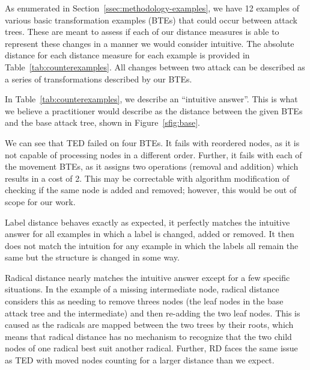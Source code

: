 As enumerated in Section~\ref{ssec:methodology-examples}, we have 12 examples of various basic transformation examples (BTEs) that could occur between attack trees. These are meant to assess if each of our distance measures is able to represent these changes in a manner we would consider intuitive. The absolute distance for each distance measure for each example is provided in Table~\ref{tab:counterexamples}. All changes between two attack can be described as a series of transformations described by our BTEs.

In Table~\ref{tab:counterexamples}, we describe an ``intuitive answer''. This is what we believe a practitioner would describe as the distance between the given BTEs and the base attack tree, shown in Figure~\ref{sfig:base}.

We can see that TED failed on four BTEs. It fails with reordered nodes, as it is not capable of processing nodes in a different order. Further, it fails with each of the movement BTEs, as it assigns two operations (removal and addition) which results in a cost of 2. This may be correctable with algorithm modification of checking if the same node is added and removed; however, this would be out of scope for our work.

Label distance behaves exactly as expected, it perfectly matches the intuitive answer for all examples in which a label is changed, added or removed. It then does not match the intuition for any example in which the labels all remain the same but the structure is changed in some way.

Radical distance nearly matches the intuitive answer except for a few specific situations. In the example of a missing intermediate node, radical distance considers this as needing to remove threes nodes (the leaf nodes in the base attack tree and the intermediate) and then re-adding the two leaf nodes. This is caused as the radicals are mapped between the two trees by their roots, which means that radical distance has no mechanism to recognize that the two child nodes of one radical best suit another radical.
Further, RD faces the same issue as TED with moved nodes counting for a larger distance than we expect.

